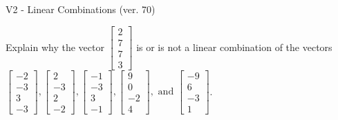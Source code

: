 \begin{exercise}
  \begin{exerciseTitle}V2 - Linear Combinations (ver. 70)\end{exerciseTitle}
  \begin{exerciseStatement}
    Explain why the vector \(\left[\begin{array}{c}
2 \\
7 \\
7 \\
3
\end{array}\right]\)  is or is not a linear 
	combination of the vectors \(\left[\begin{array}{c}
-2 \\
-3 \\
3 \\
-3
\end{array}\right] , \left[\begin{array}{c}
2 \\
-3 \\
2 \\
-2
\end{array}\right] , \left[\begin{array}{c}
-1 \\
-3 \\
3 \\
-1
\end{array}\right] , \left[\begin{array}{c}
9 \\
0 \\
-2 \\
4
\end{array}\right] , \text{ and } \left[\begin{array}{c}
-9 \\
6 \\
-3 \\
1
\end{array}\right]\).
	



\end{exerciseStatement}
\end{exercise}
